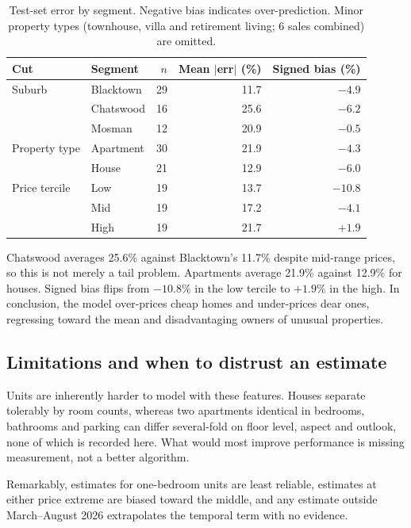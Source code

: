 \begin{table}[H]
\centering\small
\begin{tabular}{@{}l l r r r@{}}
\toprule
\textbf{Cut} & \textbf{Segment} & \textbf{$n$} & \textbf{Mean $|$err$|$ (\%)} & \textbf{Signed bias (\%)} \\
\midrule
Suburb        & Blacktown & 29 & 11.7 & $-4.9$ \\
              & Chatswood & 16 & 25.6 & $-6.2$ \\
              & Mosman    & 12 & 20.9 & $-0.5$ \\
\addlinespace
Property type & Apartment & 30 & 21.9 & $-4.3$ \\
              & House     & 21 & 12.9 & $-6.0$ \\
\addlinespace
Price tercile & Low       & 19 & 13.7 & $-10.8$ \\
              & Mid       & 19 & 17.2 & $-4.1$ \\
              & High      & 19 & 21.7 & $+1.9$ \\
\bottomrule
\end{tabular}
\caption{Test-set error by segment. Negative bias indicates over-prediction. Minor
property types (townhouse, villa and retirement living; 6 sales combined) are omitted.}
\label{tab:seg}
\end{table}

Chatswood averages 25.6\% against Blacktown's 11.7\% despite mid-range prices,
so this is not merely a tail problem. Apartments average 21.9\% against 12.9\% for
houses. Signed bias flips from $-10.8\%$ in the low tercile to $+1.9\%$ in the high. In conclusion, the
model over-prices cheap homes and under-prices dear ones, regressing toward the mean and
disadvantaging owners of unusual properties.

\subsection{Limitations and when to distrust an estimate}

Units are inherently harder to model with these features. Houses separate
tolerably by room counts, whereas two apartments identical in bedrooms, bathrooms and
parking can differ several-fold on floor level, aspect and outlook, none of which is
recorded here. What would most improve performance is missing measurement, not a better
algorithm.

Remarkably, estimates for one-bedroom units are least reliable, estimates at
either price extreme are biased toward the middle, and any estimate outside
March--August 2026 extrapolates the temporal term with no evidence.
